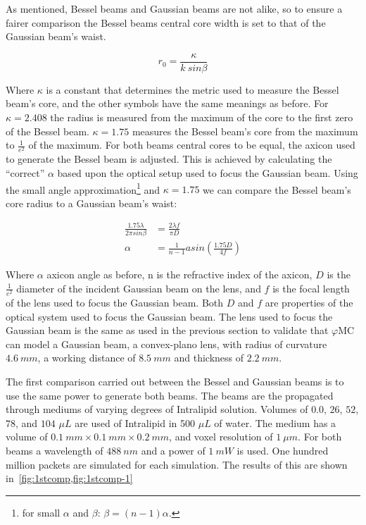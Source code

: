 As mentioned, Bessel beams and Gaussian beams are not alike, so to ensure a fairer comparison the Bessel beams central core width is set to that of the Gaussian beam's waist.

\begin{equation}
r_0=\frac{\kappa}{k\ sin\beta}  
\end{equation}

Where $\kappa$ is a constant that determines the metric used to measure the Bessel beam's core, and the other symbols have the same meanings as before.
For $\kappa=2.408$ the radius is measured from the maximum of the core to the first zero of the Bessel beam.
$\kappa=1.75$ measures the Bessel beam's core from the maximum to $\tfrac{1}{e^2}$ of the maximum.
For both beams central cores to be equal, the axicon used to generate the Bessel beam is adjusted.
This is achieved by calculating the ``correct'' $\alpha$ based upon the optical setup used to focus the Gaussian beam. 
Using the small angle approximation\footnote{for small $\alpha$ and $\beta$: $\beta=(n-1)\alpha$.} and $\kappa=1.75$ we can compare the Bessel beam's core radius to a Gaussian beam's waist:

\begin{align}
\frac{1.75\lambda}{2\pi sin\beta}&=\frac{2\lambda f}{\pi D} \\
\alpha &= \frac{1}{n-1}asin\left(\frac{1.75 D}{4 f}\right)
\end{align}

Where $\alpha$ axicon angle as before, n is the refractive index of the axicon, $D$ is the $\tfrac{1}{e^2}$ diameter of the incident Gaussian beam on the lens, and $f$ is the focal length of the lens used to focus the Gaussian beam.
Both $D$ and $f$ are properties of the optical system used to focus the Gaussian beam.
The lens used to focus the Gaussian beam is the same as used in the previous section to validate that $\varphi$MC can model a Gaussian beam, a convex-plano lens, with radius of curvature $4.6~mm$, a working distance of $8.5~mm$ and thickness of $2.2~mm$.

\medskip

The first comparison carried out between the Bessel and Gaussian beams is to use the same power to generate both beams.
The beams are the propagated through mediums of varying degrees of Intralipid solution.
Volumes of $0.0$, $26$, $52$, $78$, and $104$ $\mu L$ are used of Intralipid in 500 $\mu L$ of water.
The medium has a volume of $0.1~mm \times 0.1~mm \times 0.2~mm$, and voxel resolution of $1~\mu m$.
For both beams a wavelength of $488~nm$ and a power of $1~mW$ is used.
One hundred million packets are simulated for each simulation.
The results of this are shown in~\cref{fig:1stcomp,fig:1stcomp-1}

